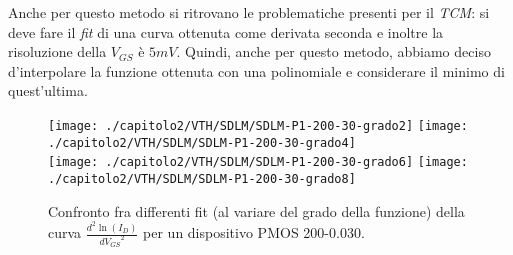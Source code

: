 Anche per questo metodo si ritrovano le problematiche presenti per il \emph{TCM}: si deve fare il \textit{fit} di una curva ottenuta come derivata seconda e inoltre la risoluzione della $V_{GS}$ è $5mV$.
Quindi, anche per questo metodo, abbiamo deciso d'interpolare la funzione ottenuta con una polinomiale e considerare il minimo di quest'ultima.

  \begin{figure}[ht]
    \centering
    \texttt{[image: ./capitolo2/VTH/SDLM/SDLM-P1-200-30-grado2]}
    \texttt{[image: ./capitolo2/VTH/SDLM/SDLM-P1-200-30-grado4]}\\
    \vspace{0.2cm}
    \texttt{[image: ./capitolo2/VTH/SDLM/SDLM-P1-200-30-grado6]}
    \texttt{[image: ./capitolo2/VTH/SDLM/SDLM-P1-200-30-grado8]}
    \caption[Confronto SDLM tra diversi fit polinomiali a diversi gradi]{Confronto fra differenti fit (al variare del grado della funzione) della curva $\frac{d^2 \ln(I_D)}{d {V_{GS}}^2}$ per un dispositivo PMOS 200-0.030.}
    \label{fig:GradiSDLM}
  \end{figure}


